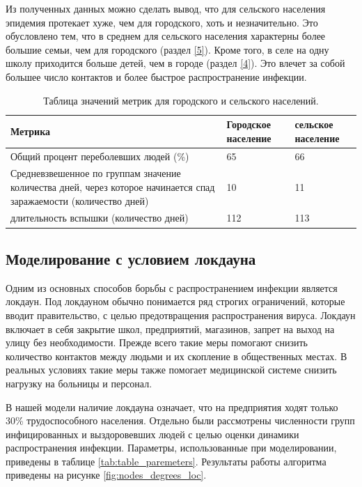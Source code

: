 \documentclass[14pt,a4paper]{article}
\begin{document}
Из полученных данных можно сделать вывод, что для сельского населения эпидемия протекает хуже, чем для городского, хоть и незначительно. Это обусловлено тем, что в среднем для сельского населения характерны более большие семьи, чем для городского (раздел \ref{5}). Кроме того, в селе на одну школу  приходится больше детей, чем в городе (раздел \ref{4}). Это влечет за собой большее число контактов и более быстрое распространение инфекции.
 
\begin{table}[h]
	\centering
	\begin{tabularx}{\textwidth}{|X|X|X|}
		\hline
		Метрика & Городское население & сельское население \\ 
		\hline
		Общий процент переболевших людей (\%)& 65 & 66 \\ 
		\hline
		Средневзвешенное по группам значение количества дней, через которое начинается спад заражаемости (количество дней) & 10 & 11\\ 
		\hline
		длительность вспышки (количество дней)& 112 & 113\\ 
		\hline
	\end{tabularx}
	\caption{Таблица значений метрик для городского и сельского населений.}
	\label{tab:exp}
\end{table}


\subsection{Моделирование с условием локдауна} 
Одним из основных способов борьбы с распространением инфекции является локдаун.
Под локдауном обычно понимается ряд строгих ограничений, которые вводит правительство, с целью предотвращения распространения вируса. Локдаун включает в себя закрытие школ, предприятий, магазинов, запрет на выход на улицу без необходимости.
Прежде всего такие меры помогают снизить количество контактов между людьми и их скопление в общественных местах. В реальных условиях такие меры также помогает медицинской системе снизить нагрузку на больницы и персонал.

В нашей модели наличие локдауна означает, что на предприятия ходят только 30\% трудоспособного населения. Отдельно были рассмотрены численности групп инфицированных и выздоровевших людей с целью оценки динамики распространения инфекции. Параметры, использованные при моделировании, приведены в таблице \ref{tab:table_paremeters}. Результаты работы алгоритма приведены на рисунке \ref{fig:nodes_degrees_loc}.
\end{document}
